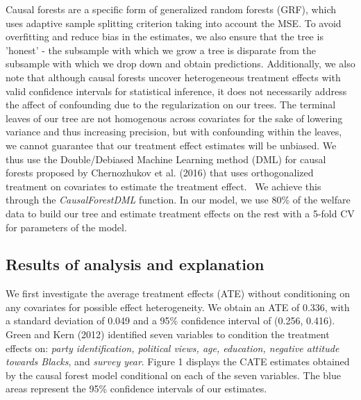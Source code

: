 \documentclass[12pt]{article}
\begin{document}
Causal forests are a specific form of generalized random forests (GRF), which uses adaptive sample splitting criterion taking into account the MSE. To avoid overfitting and reduce bias in the estimates, we also ensure that the tree is 'honest' - the subsample with which we grow a tree is disparate from the subsample with which we drop down and obtain predictions. 
Additionally, we also note that although causal forests uncover heterogeneous treatment effects with valid confidence intervals for statistical inference, it does not necessarily address the affect of confounding due to the regularization on our trees. The terminal leaves of our tree are not homogenous across covariates for the sake of lowering variance and thus increasing precision, but with confounding within the leaves, we cannot guarantee that our treatment effect estimates will be unbiased. We thus use the Double/Debiased Machine Learning method (DML) for causal forests proposed by Chernozhukov et al. (2016) that uses orthogonalized treatment on covariates to estimate the treatment effect.~\cite{DML} We achieve this through the \textit{CausalForestDML} function. In our model, we use 80\% of the welfare data to build our tree and estimate treatment effects on the rest with a 5-fold CV for parameters of the model. \\ 

\subsection{Results of analysis and explanation}
We first investigate the average treatment effects (ATE) without conditioning on any covariates for possible effect heterogeneity. We obtain an ATE of 0.336, with a standard deviation of 0.049 and a 95\% confidence interval of (0.256, 0.416). Green and Kern (2012) identified seven variables to condition the treatment effects on: \textit{party identification, political views, age, education, negative attitude towards Blacks}, and \textit{survey year}. Figure 1 displays the CATE estimates obtained by the causal forest model conditional on each of the seven variables. The blue areas represent the 95\% confidence intervals of our estimates. \\
\end{document}
